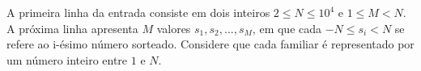 A primeira linha da entrada consiste em dois inteiros $2 \leq N \leq 10^4$ e $1 \leq M < N$. A próxima linha apresenta $M$ valores $s_1, s_2, ... , s_M$, em que cada $-N \leq s_i < N$ se refere ao i-ésimo número sorteado. Considere que cada familiar é representado por um número inteiro entre $1$ e $N$.
